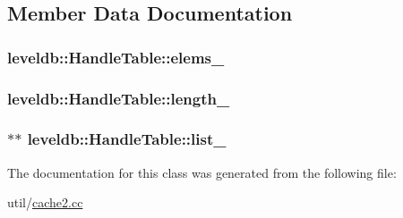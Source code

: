 \subsection{Member Data Documentation}
\hypertarget{classleveldb_1_1_handle_table_a0cfd52cf822da2362069b34be8dda5db}{}
\subsubsection[{elems\+\_\+}]{ leveldb\+::\+Handle\+Table\+::elems\+\_\+\hspace{0.3cm}{\ttfamily [private]}}\label{classleveldb_1_1_handle_table_a0cfd52cf822da2362069b34be8dda5db}
\hypertarget{classleveldb_1_1_handle_table_a8254dd30725b29b90577621864755128}{}
\subsubsection[{length\+\_\+}]{ leveldb\+::\+Handle\+Table\+::length\+\_\+\hspace{0.3cm}{\ttfamily [private]}}\label{classleveldb_1_1_handle_table_a8254dd30725b29b90577621864755128}
\hypertarget{classleveldb_1_1_handle_table_aba06182026ed4b5420c076c488e56fac}{}
\subsubsection[{list\+\_\+}]{$\ast$$\ast$ leveldb\+::\+Handle\+Table\+::list\+\_\+\hspace{0.3cm}{\ttfamily [private]}}\label{classleveldb_1_1_handle_table_aba06182026ed4b5420c076c488e56fac}


The documentation for this class was generated from the following file\+:\begin{DoxyCompactItemize}
\item 
util/\hyperlink{cache2_8cc}{cache2.\+cc}\end{DoxyCompactItemize}
